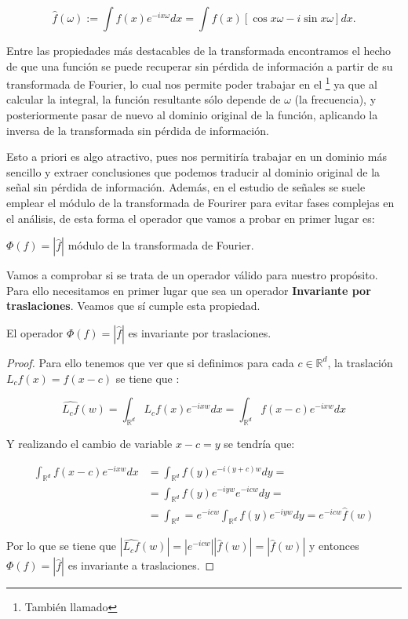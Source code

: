 \begin{equation}
\widehat{f}(\omega):= \int{f(x)e^{-ix\omega}dx}=\int{f(x)\left[\cos{x\omega} -i\sin{x\omega}\right]dx}.
\end{equation}

\noindent Entre las propiedades más destacables de la transformada encontramos el hecho de que una función se puede recuperar sin pérdida de información a partir de su transformada de Fourier, lo cual nos permite poder trabajar en el \footnote{También llamado } ya que al calcular la integral, la función resultante sólo depende de $\omega$ (la frecuencia), y posteriormente pasar de nuevo al dominio original de la función, aplicando la inversa de la transformada sin pérdida de información.

\medskip

\noindent Esto a priori es algo atractivo, pues nos permitiría trabajar en un dominio más sencillo y extraer conclusiones que podemos traducir al dominio original de la señal sin pérdida de información. Además, en el estudio de señales se suele emplear el módulo de la transformada de Fourirer para evitar fases complejas en el análisis, de esta forma el operador que vamos a probar en primer lugar es: 

\begin{definicion}
$\Phi(f)=|\widehat{f}|$ módulo de la transformada de Fourier. 
\end{definicion}

\noindent Vamos a comprobar si se trata de un operador válido para nuestro propósito. Para ello necesitamos en primer lugar que sea un operador \textbf{Invariante por traslaciones}. Veamos  que sí cumple esta propiedad.

\begin{lema}
    El operador $\Phi(f)=|\widehat{f}|$ es invariante por traslaciones.
\end{lema}

\begin{proof}
    \noindent Para ello tenemos que ver que si definimos para cada $c \in \mathbb{R}^d$, la traslación $L_cf(x)=f(x-c)$ se tiene que :  
    
    $$\widehat{L_cf}(w)=\int_{\mathbb{R}^d}{L_cf(x) e^{-ixw} dx}=\int_{\mathbb{R}^d}{f(x-c)e^{-ixw}dx}$$
    
    \noindent Y realizando el cambio de variable $x-c=y$ se tendría que: 
    
    \begin{align*}
        \int_{\mathbb{R}^d}{f(x-c)e^{-ixw}dx} &= \int_{\mathbb{R}^d}{f(y)e^{-i(y+c)w}dy}= \\      &=\int_{\mathbb{R}^d}{f(y)e^{-iyw}e^{-icw}dy}= \\ &=\int_{\mathbb{R}^d}=e^{-icw}\int_{\mathbb{R}^d}{f(y)e^{-iyw}dy}=e^{-icw}\widehat{f}(w)
    \end{align*}
    
    \noindent Por lo que se tiene que $|\widehat{L_cf}(w)|=|e^{-icw}| |\widehat{f}(w)|=|\widehat{f}(w)|$ y entonces $\Phi(f)=|\widehat{f}|$ es invariante a traslaciones. \qedhere
\end{proof}

